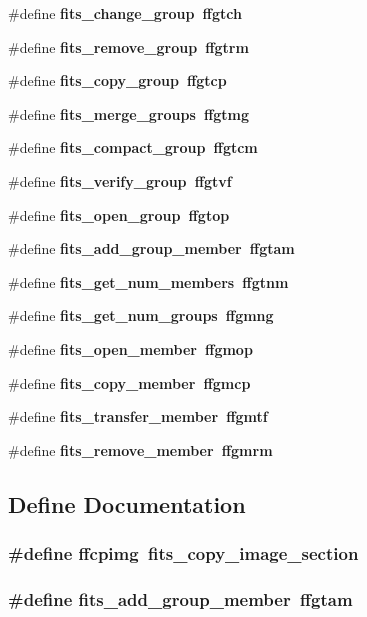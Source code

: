 \begin{CompactItemize}
\#define \bf{fits\_\-change\_\-group}~ffgtch
\item 
\#define \bf{fits\_\-remove\_\-group}~ffgtrm
\item 
\#define \bf{fits\_\-copy\_\-group}~ffgtcp
\item 
\#define \bf{fits\_\-merge\_\-groups}~ffgtmg
\item 
\#define \bf{fits\_\-compact\_\-group}~ffgtcm
\item 
\#define \bf{fits\_\-verify\_\-group}~ffgtvf
\item 
\#define \bf{fits\_\-open\_\-group}~ffgtop
\item 
\#define \bf{fits\_\-add\_\-group\_\-member}~ffgtam
\item 
\#define \bf{fits\_\-get\_\-num\_\-members}~ffgtnm
\item 
\#define \bf{fits\_\-get\_\-num\_\-groups}~ffgmng
\item 
\#define \bf{fits\_\-open\_\-member}~ffgmop
\item 
\#define \bf{fits\_\-copy\_\-member}~ffgmcp
\item 
\#define \bf{fits\_\-transfer\_\-member}~ffgmtf
\item 
\#define \bf{fits\_\-remove\_\-member}~ffgmrm
\end{CompactItemize}


\subsection{Define Documentation}
\subsubsection{\setlength{\rightskip}{0pt plus 5cm}\#define ffcpimg~fits\_\-copy\_\-image\_\-section}\label{longnam_8h_421f404476b1124203a4959cfe5ffa55}


\subsubsection{\setlength{\rightskip}{0pt plus 5cm}\#define fits\_\-add\_\-group\_\-member~ffgtam}\label{longnam_8h_77e070fc3e3583484c9ad06028fd414d}


